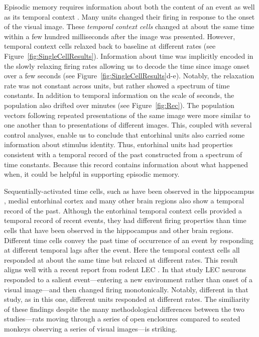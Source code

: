 \documentclass{apa}
\begin{document}
Episodic memory requires information about both the content of an event as
well as its temporal context \cite{Tulv83,EichEtal07,Eich17a}.  
Many units changed their firing in response to the onset of the visual image.
These \emph{temporal context cells} changed at about the same time within a
few hundred milliseconds after the image was presented.  However, temporal
context cells  relaxed back to baseline at different rates (see
Figure~\ref{fig:SingleCellResults}).  Information about time was implicitly
encoded in the slowly  relaxing firing rates allowing us to decode the time
since image onset over a few seconds (see Figure~\ref{fig:SingleCellResults}d-e). 
Notably, the relaxation rate was not constant across units, but rather
showed a spectrum of time constants.
In addition to temporal information on the scale of seconds, the population
also drifted over minutes (see Figure~\ref{fig:Rec}).
The population vectors following repeated presentations of the same image were
more similar to one another than to presentations of different images.   This,
coupled with several control analyses, enable us to conclude that entorhinal
units also carried some information about stimulus identity.  
Thus, entorhinal units had properties consistent with a temporal
record of the past constructed from a spectrum of time constants.  Because
this record contains information about what happened when, it could  be
helpful in supporting episodic memory.


Sequentially-activated time cells, such as have been observed in the
hippocampus \cite{PastEtal08,MacDEtal11,SalzEtal16}, medial entorhinal cortex
\cite{KrauEtal15} and many other brain regions
\cite{JinEtal09,MellEtal15,TigaEtal18a,TigaEtal17} also show a temporal record
of the past.
Although the entorhinal temporal context cells provided a temporal record of recent
events, they had different firing properties than time cells that have been
observed in the hippocampus and  other brain regions.   Different time cells convey the
past time of occurrence of an event by responding at different temporal lags
after the event.   Here the temporal context cells all responded at about the
same time but relaxed at different rates.  This result aligns well with
a recent report from rodent LEC \cite{TsaoEtal18}.  In that study LEC neurons
responded to a salient event---entering a new environment rather than onset of
a visual image---and then changed firing monotonically.  Notably, different
in that study, as in this one, different units responded at different rates.
The similiarity of these findings despite the many methodological differences
between the two studies---rats moving through a series of open enclosures
compared to seated monkeys observing a series of visual images---is striking.
\end{document}
